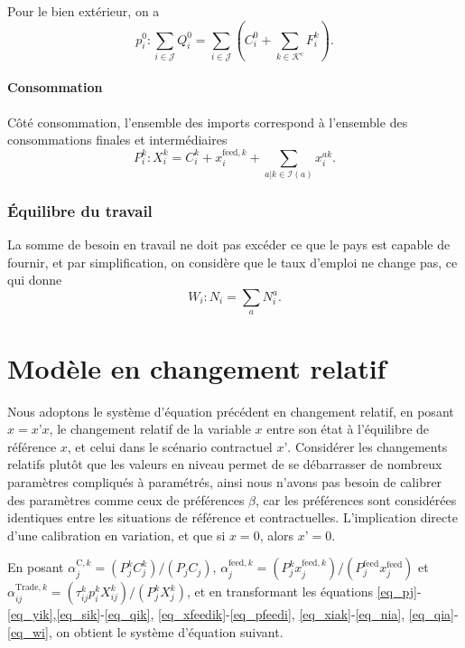 Pour le bien extérieur, on a
\begin{equation}
	p_i^0: \sum_{i \in \mathcal{J}} Q_i^0 = \sum_{i \in \mathcal{J}} \left( C_i^0 + \sum_{k \in \mathcal{K}^c} F_i^k \right).
\end{equation}

\paragraph{Consommation} Côté consommation, l’ensemble des imports correspond à l’ensemble des consommations finales et intermédiaires
\begin{equation}
	P_i^k: X_i^k=C_i^k + x_i^{\text{feed},k} + \sum_{a | k \in \mathcal{I}(a)} x_i^{ak}.
\end{equation}

\subsubsection{Équilibre du travail}
La somme de besoin en travail ne doit pas excéder ce que le pays est capable de fournir, et par simplification, on considère que le taux d’emploi ne change pas, ce qui donne
\begin{equation}\label{eq_wi}
	W_i: N_i=\sum_a N_i^a.
\end{equation}

\section{Modèle en changement relatif}

Nous adoptons le système d’équation précédent en changement relatif, en posant $\hat{x} = x’ x$, le changement relatif de la variable $x$ entre son état à l’équilibre de référence $x$, et celui dans le scénario contractuel $x’$. Considérer les changements relatifs plutôt que les valeurs en niveau permet de se débarrasser de nombreux paramètres compliqués à paramétrés, ainsi nous n’avons pas besoin de calibrer des paramètres comme ceux de préférences $\beta$, car les préférences sont considérées identiques entre les situations de référence et contractuelles. L’implication directe d’une calibration en variation, et que si $x = 0$, alors $x’ = 0$.

En posant $\alpha_j^{\text{C},k} = {(P_j^k C_j^k)}/{(P_j C_j)}$, $\alpha^{\text{feed},k}_j = {(P_j^k x^{\text{feed},k}_j)} /{(P^\text{feed}_j x^\text{feed}_j)}$ et $\alpha^{\text{Trade},k}_{ij} = (\tau_{ij}^k p_i^k X_{ij}^k)/(P_j^kX_{j}^k)$, et en transformant les équations \ref{eq_pj}-\ref{eq_yik},\ref{eq_sik}-\ref{eq_qik}, \ref{eq_xfeedik}-\ref{eq_pfeedi}, \ref{eq_xiak}-\ref{eq_nia}, \ref{eq_qia}-\ref{eq_wi}, on obtient le système d'équation suivant.

